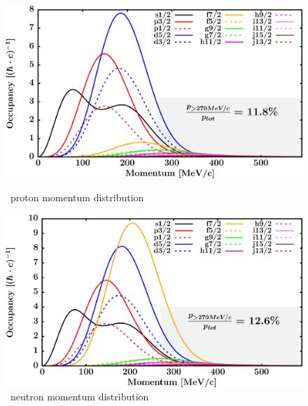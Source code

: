 \begin{figure}[hbtp]
    \centering
    \begin{minipage}{0.45\textwidth}
        \centering
        \includegraphics[width=\textwidth]{figures/ca48_protonLJMomentumDistIntegral.png}
        \caption*{\caEight\ proton momentum distribution}
        \label{DOMFitData_ca48_proton_momentumDist}
    \end{minipage}\hspace{6pt}
    \begin{minipage}{0.45\textwidth}
        \centering
        \includegraphics[width=\textwidth]{figures/ca48_neutronLJMomentumDistIntegral.png}
        \caption*{\caEight\ neutron momentum distribution}
        \label{DOMFitData_ca48_neutron_momentumDist}
    \end{minipage}
\end{figure}
\vspace{0.3in}
